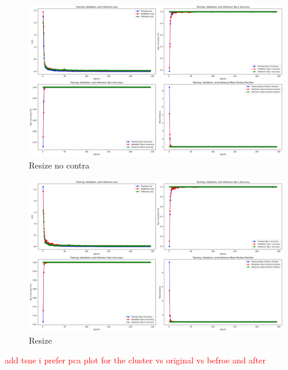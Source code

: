\begin{figure}[H]
  \centering
  \includegraphics[scale=0.3]{figures/Resize_No_contra.png} 
  \caption{Resize no contra}
  \label{fig:Resize_No_contra_b64}
\end{figure}

\begin{figure}[H]
  \centering
  \includegraphics[scale=0.3]{figures/Resize.png} 
  \caption{Resize}
  \label{fig:Resize_b64}
\end{figure}


\textcolor{red}{add tsne i prefer pca plot for the cluster vs original vs befroe and after}